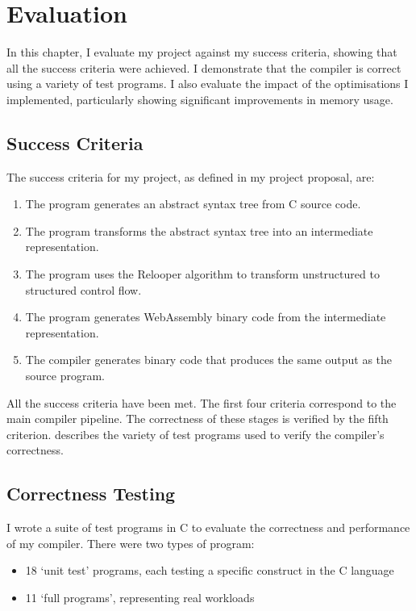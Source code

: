 \documentclass[00-main.tex]{subfiles}
\begin{document}
\chapter{Evaluation}

\newcommand{\IncludeStackPlot}[1]{\resizebox{0.98\textwidth}{!}{}}

In this chapter, I evaluate my project against my success criteria, showing that all the success criteria were achieved.
I demonstrate that the compiler is correct using a variety of test programs.
I also evaluate the impact of the optimisations I implemented, particularly showing significant improvements in memory usage.


\section{Success Criteria}\label{sec:eval:success criteria}

The success criteria for my project, as defined in my project proposal, are:
\begin{enumerate}[nosep, itemsep=2pt]
\item The program generates an abstract syntax tree from C source code.
\item The program transforms the abstract syntax tree into an intermediate representation.
\item The program uses the Relooper algorithm to transform unstructured to structured control
flow.
\item The program generates WebAssembly binary code from the intermediate representation.
\item The compiler generates binary code that produces the same output as the source program.
\end{enumerate}

All the success criteria have been met.
The first four criteria correspond to the main compiler pipeline.
The correctness of these stages is verified by the fifth criterion.
 describes the variety of test programs used to verify the compiler's correctness.


\section{Correctness Testing}\label{sec:eval:correctness testing}

I wrote a suite of test programs in C to evaluate the correctness and performance of my compiler.
There were two types of program:
\begin{itemize}[nosep, itemsep=2pt]
\item 18 `unit test' programs, each testing a specific construct in the C language
\item 11 `full programs', representing real workloads
\end{itemize}
\end{document}

